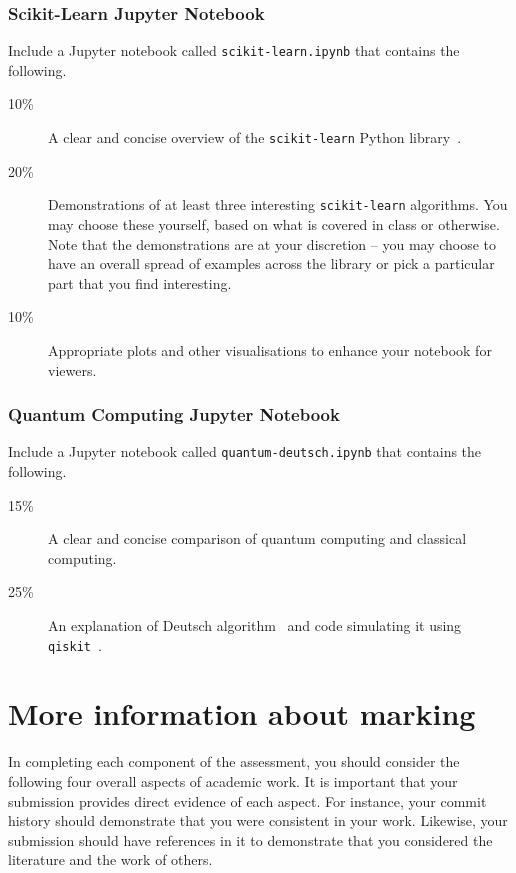 \documentclass[a4paper, 12pt]{scrartcl}
\begin{document}
  \subsubsection*{Scikit-Learn Jupyter Notebook}
  Include a Jupyter notebook called \texttt{scikit-learn.ipynb} that contains the following.
  \begin{description}
    \item[10\%] A clear and concise overview of the \texttt{scikit-learn} Python library~\cite{scikit-learn}.
    \item[20\%] Demonstrations of at least three interesting \texttt{scikit-learn} algorithms. You may choose these yourself, based on what is covered in class or otherwise. Note that the demonstrations are at your discretion -- you may choose to have an overall spread of examples across the library or pick a particular part that you find interesting.
    \item[10\%] Appropriate plots and other visualisations to enhance your notebook for viewers.
  \end{description}
  
  \subsubsection*{Quantum Computing Jupyter Notebook}
  Include a Jupyter notebook called \texttt{quantum-deutsch.ipynb} that contains the following.
  \begin{description}
    \item[15\%] A clear and concise comparison of quantum computing and classical computing.
    \item[25\%] An explanation of Deutsch algorithm~\cite{deutschalgorithm} and code simulating it using \texttt{qiskit}~\cite{qiskit}.
  \end{description}

  \section*{More information about marking}
    In completing each component of the assessment, you should consider the following four overall aspects of academic work.
    It is important that your submission provides direct evidence of each aspect.
    For instance, your commit history should demonstrate that you were consistent in your work.
    Likewise, your submission should have references in it to demonstrate that you considered the literature and the work of others.
  
\end{document}
